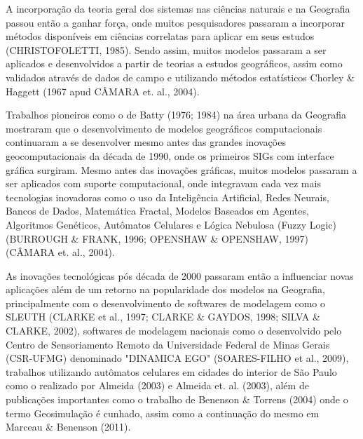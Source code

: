 A incorporação da teoria geral dos sistemas nas ciências naturais e na Geografia passou então a ganhar força, onde muitos pesquisadores passaram a incorporar métodos disponíveis em ciências correlatas para aplicar em seus estudos (CHRISTOFOLETTI, 1985)\cite{CHRISTOFOLETTI}. Sendo assim, muitos modelos passaram a ser aplicados e desenvolvidos a partir de teorias a estudos geográficos, assim como validados através de dados de campo e utilizando métodos estatísticos Chorley \& Haggett (1967\cite{CHORLEY_HAGGETT} apud CÂMARA\cite{CAMARA_etal04} et. al., 2004).

Trabalhos pioneiros como o de Batty (1976\cite{BATTY76}; 1984\cite{BATTY84}) na área urbana da Geografia mostraram que o desenvolvimento de modelos geográficos computacionais continuaram a se desenvolver mesmo antes das grandes inovações geocomputacionais da década de 1990, onde os primeiros SIGs com interface gráfica surgiram. Mesmo antes das inovações gráficas, muitos modelos passaram a ser aplicados com suporte computacional, onde integravam cada vez mais tecnologias inovadoras como o uso da Inteligência Artificial, Redes Neurais, Bancos de Dados, Matemática Fractal, Modelos Baseados em Agentes, Algoritmos Genéticos, Autômatos Celulares e Lógica Nebulosa (Fuzzy Logic) (BURROUGH \& FRANK, 1996\cite{BURROUGH_FRANK}; OPENSHAW \& OPENSHAW, 1997\cite{OPENSHAW_OPENSHAW}) (CÂMARA et. al., 2004)\cite{CAMARA_etal04}.

As inovações tecnológicas pós década de 2000 passaram então a influenciar novas aplicações além de um retorno na popularidade dos modelos na Geografia, principalmente com o desenvolvimento de softwares de modelagem como o SLEUTH (CLARKE et al., 1997\cite{CLARKE_elal97}; CLARKE \& GAYDOS, 1998\cite{CLARKE_GAYDOS}; SILVA \& CLARKE, 2002\cite{SILVA_KEITH}), softwares de modelagem nacionais como o desenvolvido pelo Centro de Sensoriamento Remoto da Universidade Federal de Minas Gerais (CSR-UFMG) denominado "DINAMICA EGO" (SOARES-FILHO et al., 2009)\cite{SOARES_FILHO_etal09}, trabalhos utilizando autômatos celulares em cidades do interior de São Paulo como o realizado por Almeida (2003)\cite{ALMEIDA} e Almeida et. al. (2003)\cite{ALMEIDA_etal03},  além de publicações importantes como o trabalho de Benenson \& Torrens (2004)\cite{BENENSON_TORRENS} onde o termo Geosimulação é cunhado, assim como a continuação do mesmo em Marceau \& Benenson (2011)\cite{MARCEAU_BENENSON}.


